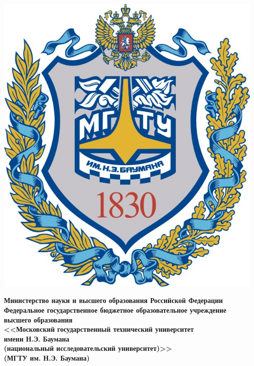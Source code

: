 \begin{titlepage}
	\noindent\begin{minipage}{0.05\textwidth}
		\includegraphics[scale=0.3]{img/bmstu.jpg}
	\end{minipage}
	\hfill
	\begin{minipage}{0.85\textwidth}\raggedleft
		\begin{center}
			\fontsize{12pt}{0.3\baselineskip}\selectfont \textbf{Министерство науки и высшего образования Российской Федерации \\ Федеральное государственное бюджетное образовательное учреждение \\ высшего образования \\ <<Московский государственный технический университет \\ имени Н.Э. Баумана \\ (национальный исследовательский университет)>> \\ (МГТУ им. Н.Э. Баумана)}
		\end{center}
	\end{minipage}
	
	\begin{center}
		\fontsize{12pt}{0.1\baselineskip}\selectfont
		\noindent\makebox[\linewidth]{\rule{\textwidth}{4pt}} \makebox[\linewidth]{\rule{\textwidth}{1pt}}
	\end{center}
	

\end{titlepage}
